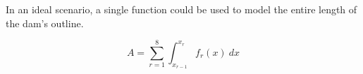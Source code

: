 \documentclass{article}
\begin{document}
    In an ideal scenario, a single function could be used to model the entire length of the dam's outline.  

    \begin{equation}
       A = \sum_{r=1}^8 \int_{x_{r-1}}^{x_r} f_r(x)\ {dx}
    \end{equation}
 
\end{document}
